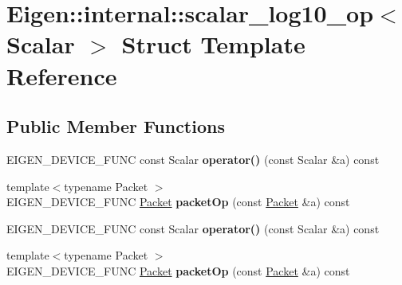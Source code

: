 \hypertarget{struct_eigen_1_1internal_1_1scalar__log10__op}{}\section{Eigen\+:\+:internal\+:\+:scalar\+\_\+log10\+\_\+op$<$ Scalar $>$ Struct Template Reference}
\label{struct_eigen_1_1internal_1_1scalar__log10__op}
\subsection*{Public Member Functions}
\begin{DoxyCompactItemize}
\item 
\mbox{\label{struct_eigen_1_1internal_1_1scalar__log10__op_a3c8821c91756cbc91df0302e6137e9fc}} 
E\+I\+G\+E\+N\+\_\+\+D\+E\+V\+I\+C\+E\+\_\+\+F\+U\+NC const Scalar {\bfseries operator()} (const Scalar \&a) const
\item 
\mbox{\label{struct_eigen_1_1internal_1_1scalar__log10__op_a4463e406dacc75a57e8fbd6557ae9afc}} 
{\footnotesize template$<$typename Packet $>$ }\\E\+I\+G\+E\+N\+\_\+\+D\+E\+V\+I\+C\+E\+\_\+\+F\+U\+NC \hyperlink{union_eigen_1_1internal_1_1_packet}{Packet} {\bfseries packet\+Op} (const \hyperlink{union_eigen_1_1internal_1_1_packet}{Packet} \&a) const
\item 
\mbox{\label{struct_eigen_1_1internal_1_1scalar__log10__op_a3c8821c91756cbc91df0302e6137e9fc}} 
E\+I\+G\+E\+N\+\_\+\+D\+E\+V\+I\+C\+E\+\_\+\+F\+U\+NC const Scalar {\bfseries operator()} (const Scalar \&a) const
\item 
\mbox{\label{struct_eigen_1_1internal_1_1scalar__log10__op_a4463e406dacc75a57e8fbd6557ae9afc}} 
{\footnotesize template$<$typename Packet $>$ }\\E\+I\+G\+E\+N\+\_\+\+D\+E\+V\+I\+C\+E\+\_\+\+F\+U\+NC \hyperlink{union_eigen_1_1internal_1_1_packet}{Packet} {\bfseries packet\+Op} (const \hyperlink{union_eigen_1_1internal_1_1_packet}{Packet} \&a) const
\end{DoxyCompactItemize}


